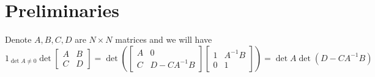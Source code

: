 \chapter{Preliminaries}

\begin{lemma}
    Denote $A,B,C,D$ are $N\times N$ matrices and we will have
    \[
    1_{\det A \neq 0}\det\left[\begin{array}{cc}
        A & B \\
        C & D
    \end{array}\right] = \det\left(\left[\begin{array}{cc}
        A & 0 \\
        C & D-CA^{-1}B
    \end{array}\right]\left[\begin{array}{cc}
        1 & A^{-1}B \\
        0 & 1
    \end{array}\right]\right) = \det A \det (D-CA^{-1}B)
    \]
\end{lemma}

\begin{lemma}
    
\end{lemma}
